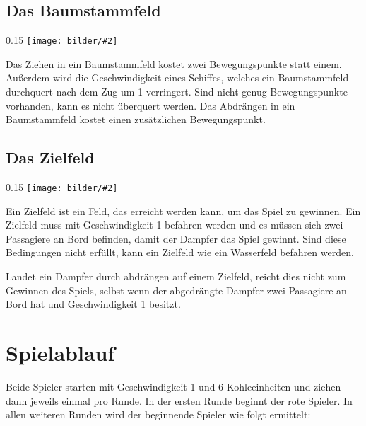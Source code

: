 \documentclass[12pt,a4paper, ngerman, oneside]{scrartcl}
\newcommand{\fieldGraphic}[2]{%
\begin{floatingfigure}[#1]{0.15\textwidth}%
  \centering
  \texttt{[image: bilder/\#2]}%
\end{floatingfigure}%
}
\begin{document}
\paragraph{}

\subsection{Das Baumstammfeld}

\fieldGraphic{r}{baumstaemme}

Das Ziehen in ein Baumstammfeld kostet zwei Bewegungspunkte statt einem.
Außerdem wird die Geschwindigkeit eines Schiffes, welches ein Baumstammfeld
durchquert nach dem Zug um 1 verringert. Sind nicht genug Bewegungspunkte
vorhanden, kann es nicht überquert werden. Das Abdrängen in ein Baumstammfeld
kostet einen zusätzlichen Bewegungspunkt.

\paragraph{}

\subsection{\label{goal}Das Zielfeld}

\fieldGraphic{r}{ziel}

Ein Zielfeld ist ein Feld, das erreicht werden kann, um das Spiel zu gewinnen.
Ein Zielfeld muss mit Geschwindigkeit 1 befahren werden und es müssen sich zwei
Passagiere an Bord befinden, damit der Dampfer das Spiel gewinnt. Sind diese
Bedingungen nicht erfüllt, kann ein Zielfeld wie ein Wasserfeld befahren werden.

Landet ein Dampfer durch abdrängen auf einem Zielfeld, reicht dies nicht zum
Gewinnen des Spiels, selbst wenn der abgedrängte Dampfer zwei Passagiere an Bord
hat und Geschwindigkeit 1 besitzt.

\paragraph{}

\section{Spielablauf}

Beide Spieler starten mit Geschwindigkeit 1 und 6 Kohleeinheiten und ziehen dann
jeweils einmal pro Runde. In der ersten Runde beginnt der rote Spieler. In allen
weiteren Runden wird der beginnende Spieler wie folgt ermittelt:
\end{document}
